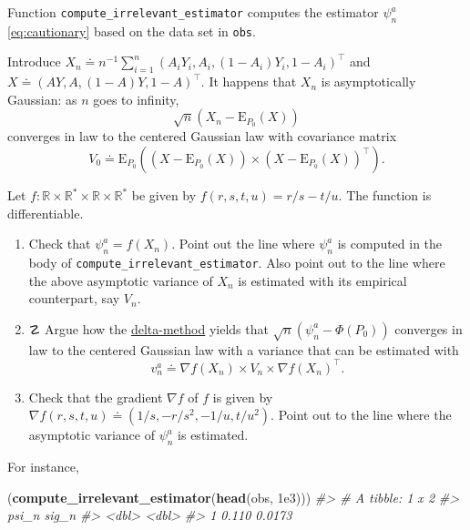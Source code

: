 \documentclass[11pt,openright,twoside]{book}
\newenvironment{Shaded}{\begin{snugshade}}{\end{snugshade}}
\newcommand{\CommentTok}[1]{\textcolor[rgb]{0.56,0.35,0.01}{\textit{#1}}}
\newcommand{\FloatTok}[1]{\textcolor[rgb]{0.00,0.00,0.81}{#1}}
\newcommand{\KeywordTok}[1]{\textcolor[rgb]{0.13,0.29,0.53}{\textbf{#1}}}
\newcommand{\NormalTok}[1]{#1}
\DeclareRobustCommand{\stixdanger}{%
  {\usefont{U}{stixbbit}{m}{it}\symbol{"F6}}%
}
\newcommand{\bbR}{\mathbb{R}}
\newcommand{\defq}{\doteq}
\newcommand{\Exp}{\textrm{E}}
\theoremstyle{definition}
\theoremstyle{definition}
\theoremstyle{definition}
\theoremstyle{remark}
\begin{document}
Function \texttt{compute\_irrelevant\_estimator} computes the estimator \(\psi_{n}^{a}\)
\eqref{eq:cautionary} based on the data set in \texttt{obs}.

Introduce \(X_{n} \defq n^{-1}\sum_{i=1}^{n} \left(A_{i}Y_{i}, A_{i}, (1-A_{i})Y_{i}, 1-A_{i}\right)^{\top}\) and \(X \defq \left(AY, A, (1-A)Y, 1-A\right)^{\top}\). It happens that \(X_{n}\) is asymptotically Gaussian: as
\(n\) goes to infinity,\begin{equation*}\sqrt{n} \left(X_{n}  -  \Exp_{P_{0}}
(X)\right)\end{equation*} converges in law to the centered Gaussian law with
covariance matrix \begin{equation*}V_{0} \defq \Exp_{P_{0}} \left((X
- \Exp_{P_{0}} (X)) \times (X- \Exp_{P_{0}} (X))^{\top}\right).\end{equation*}

Let \(f:\bbR\times \bbR^{*} \times \bbR\times \bbR^{*}\) be given by \(f(r,s,t,u) = r/s - t/u\). The function is differentiable.

\begin{enumerate}
\def\labelenumi{\arabic{enumi}.}
\item
  Check that \(\psi_{n}^{a} = f(X_{n})\). Point out the line where
  \(\psi_{n}^{a}\) is computed in the body of \texttt{compute\_irrelevant\_estimator}.
  Also point out to the line where the above asymptotic variance of \(X_{n}\)
  is estimated with its empirical counterpart, say \(V_{n}\).
\item
  ☡ \stixdanger{} Argue how the \protect\hyperlink{prop-delta-method}{delta-method}
  yields that \(\sqrt{n}(\psi_{n}^{a} - \Phi(P_{0}))\) converges in law to the
  centered Gaussian law with a variance that can be estimated with
  \begin{equation}  v_{n}^{a}  \defq  \nabla f(X_{n})  \times  V_{n}  \times
  \nabla f(X_{n})^{\top}. \label{eq:v-n-a} \end{equation}
\item
  Check that the gradient \(\nabla f\) of \(f\) is given by \(\nabla f(r,s,t,u) \defq (1/s, -r/s^{2}, -1/u, t/u^{2})\). Point out to the line where the
  asymptotic variance of \(\psi_{n}^{a}\) is estimated.
\end{enumerate}

For instance,

\begin{Shaded}
\begin{Highlighting}[]
\NormalTok{(}\KeywordTok{compute_irrelevant_estimator}\NormalTok{(}\KeywordTok{head}\NormalTok{(obs, }\FloatTok{1e3}\NormalTok{)))}
\CommentTok{#> # A tibble: 1 x 2}
\CommentTok{#>   psi_n  sig_n}
\CommentTok{#>   <dbl>  <dbl>}
\CommentTok{#> 1 0.110 0.0173}
\end{Highlighting}
\end{Shaded}
\end{document}
